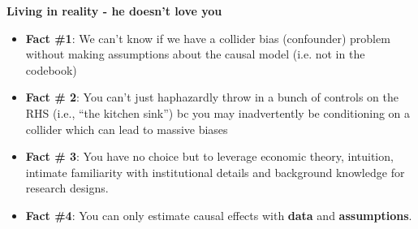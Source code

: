 \documentclass[notes=show]{beamer}
\begin{document}
\begin{frame}[plain]
\begin{center}
\textbf{Living in reality - he doesn't love you}
\end{center}

\begin{itemize}

\item \textbf{Fact \#1}: We can't know if we have a collider bias (confounder) problem without making assumptions about the causal model (i.e. not in the codebook)
\item \textbf{Fact \# 2}: You can't just haphazardly throw in a bunch of controls on the RHS (i.e., ``the kitchen sink'') bc you may inadvertently be conditioning on a collider which can lead to massive biases
\item \textbf{Fact \# 3}: You have no choice but to leverage economic theory, intuition, intimate familiarity with institutional details and background knowledge for research designs.  
\item \textbf{Fact \#4}: You can only estimate causal effects with \textbf{data} and \textbf{assumptions}.
\end{itemize}

\end{frame}




\end{document}
